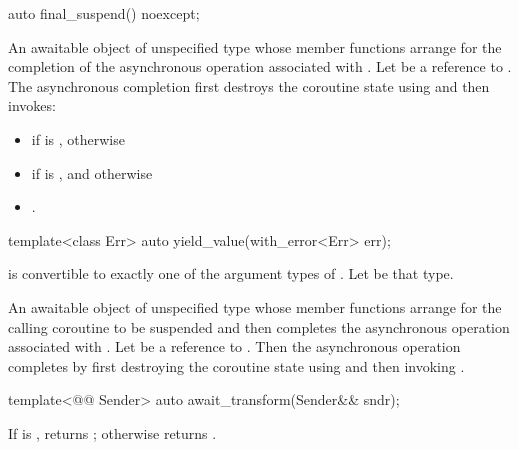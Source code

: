 %
\begin{itemdecl}
auto final_suspend() noexcept;
\end{itemdecl}
\begin{itemdescr}
\pnum
\returns
An awaitable object of unspecified type whose
member functions arrange for the completion of the asynchronous
operation associated with .
Let  be a reference to .
The asynchronous completion first destroys the coroutine state
using  and then invokes:
\begin{itemize}
\item
{}
if  is , otherwise
\item
{} if  is ,
and otherwise
\item
 .
\end{itemize}
\end{itemdescr}

%
\begin{itemdecl}
template<class Err>
  auto yield_value(with_error<Err> err);
\end{itemdecl}
\begin{itemdescr}
\pnum
\mandates
{} is convertible to exactly one of the
 argument types of .
Let  be that type.

\pnum
\returns
An awaitable object of unspecified type whose
member functions arrange for the calling coroutine to be suspended
and then completes the asynchronous operation associated with
.
Let  be a reference to .
Then the asynchronous operation completes by first
destroying the coroutine state using 
and then invoking
.
\end{itemdescr}

%
\begin{itemdecl}
template<@@ Sender>
  auto await_transform(Sender&& sndr);
\end{itemdecl}
\begin{itemdescr}
\pnum
\returns
If 
is ,
returns ;
otherwise returns .
\end{itemdescr}


